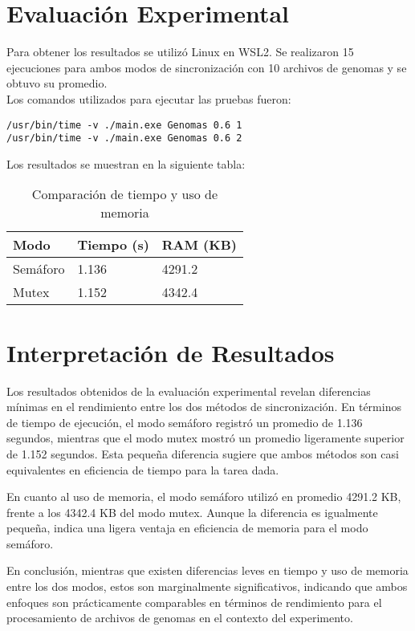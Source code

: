\documentclass[
	spanish, %
	oneside
]{article}
\begin{document}
\newpage
\section*{Evaluación Experimental}
\noindent Para obtener los resultados se utilizó Linux en WSL2. Se realizaron 15 ejecuciones para ambos modos de sincronización con 10 archivos de genomas y se obtuvo su promedio. 
\\ Los comandos utilizados para ejecutar las pruebas fueron:

\begin{verbatim}
/usr/bin/time -v ./main.exe Genomas 0.6 1
/usr/bin/time -v ./main.exe Genomas 0.6 2
\end{verbatim}

\vspace*{5pt}
\noindent Los resultados se muestran en la siguiente tabla:
\vspace*{2pt}

\begin{table}[h]
\centering
\begin{tabular}{|l|l|l|}
\hline
\textbf{Modo} & \textbf{Tiempo (s)} & \textbf{RAM (KB)} \\ \hline
Semáforo & 1.136 & 4291.2 \\ \hline
Mutex & 1.152 & 4342.4 \\ \hline
\end{tabular}
\caption{Comparación de tiempo y uso de memoria}
\label{tab:comparacion}
\end{table}

\section*{Interpretación de Resultados}

\noindent Los resultados obtenidos de la evaluación experimental revelan diferencias mínimas en el rendimiento entre los dos métodos de sincronización. En términos de tiempo de ejecución, el modo semáforo registró un promedio de 1.136 segundos, mientras que el modo mutex mostró un promedio ligeramente superior de 1.152 segundos. Esta pequeña diferencia sugiere que ambos métodos son casi equivalentes en eficiencia de tiempo para la tarea dada.
\vspace*{10pt}

\noindent En cuanto al uso de memoria, el modo semáforo utilizó en promedio 4291.2 KB, frente a los 4342.4 KB del modo mutex. Aunque la diferencia es igualmente pequeña, indica una ligera ventaja en eficiencia de memoria para el modo semáforo.
\vspace*{10pt}

\noindent En conclusión, mientras que existen diferencias leves en tiempo y uso de memoria entre los dos modos, estos son marginalmente significativos, indicando que ambos enfoques son prácticamente comparables en términos de rendimiento para el procesamiento de archivos de genomas en el contexto del experimento.





\end{document}
